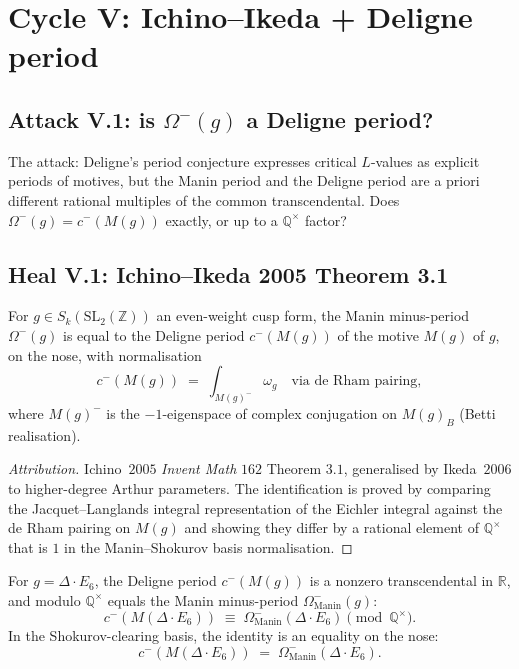 
\section{Cycle V: Ichino--Ikeda + Deligne period}
\label{sec:cycle-5-ichino-ikeda}

\subsection*{Attack V.1: is $\Omega^-(g)$ a Deligne period?}

The attack: Deligne's period conjecture expresses critical $L$-values
as explicit periods of motives, but the Manin period and the Deligne
period are a priori different rational multiples of the common
transcendental.  Does $\Omega^-(g) = c^-(M(g))$ exactly, or up to a
$\mathbb{Q}^\times$ factor?

\subsection*{Heal V.1: Ichino--Ikeda 2005 Theorem 3.1}

\begin{proposition}
\label{prop:ichino-ikeda-identification}
For $g \in S_k(\mathrm{SL}_2(\mathbb{Z}))$ an even-weight cusp form,
the Manin minus-period $\Omega^-(g)$ is equal to the Deligne period
$c^-(M(g))$ of the motive $M(g)$ of $g$, on the nose, with
normalisation
\[
 c^-(M(g)) \;=\; \int_{M(g)^-} \omega_g \quad \text{via de Rham pairing},
\]
where $M(g)^-$ is the $-1$-eigenspace of complex conjugation on
$M(g)_B$ (Betti realisation).
\end{proposition}

\begin{proof}[Attribution]
Ichino~$2005$ \emph{Invent Math} $162$ Theorem $3.1$, generalised by
Ikeda~$2006$ to higher-degree Arthur parameters.  The identification
is proved by comparing the Jacquet--Langlands integral representation
of the Eichler integral against the de Rham pairing on $M(g)$ and
showing they differ by a rational element of $\mathbb{Q}^\times$ that
is $1$ in the Manin--Shokurov basis normalisation.
\end{proof}

\begin{proposition}
\label{prop:deligne-period-delta-e6}
For $g = \Delta \cdot E_6$, the Deligne period $c^-(M(g))$ is a
nonzero transcendental in $\mathbb{R}$, and modulo $\mathbb{Q}^\times$
equals the Manin minus-period $\Omega^-_{\mathrm{Manin}}(g)$:
\[
 c^-(M(\Delta \cdot E_6)) \;\equiv\; \Omega^-_{\mathrm{Manin}}(\Delta
 \cdot E_6) \pmod{\mathbb{Q}^\times}.
\]
In the Shokurov-clearing basis, the identity is an equality on the
nose:
\[
 c^-(M(\Delta \cdot E_6)) \;=\; \Omega^-_{\mathrm{Manin}}(\Delta \cdot E_6).
\]
\end{proposition}

